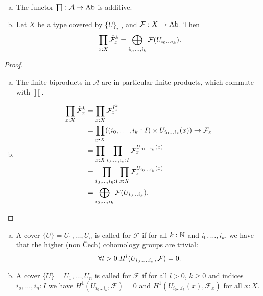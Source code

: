 \begin{remark}
  \label{cech-sheaf-pi-direct-sum}
  \begin{enumerate}[(a)]
  \item The functor $\prod:\mathcal A \to \operatorname{Ab}$ is additive.
  \item Let $X$ be a type covered by $\{U\}_{i:I}$ and $\mathcal F : X\to \operatorname{Ab}$.
    Then 
    \[
      \prod_{x:X} \check{\mathcal F}^k_x=\bigoplus_{i_0,\dots,i_k}\mathcal F(U_{i_0\dots i_k})
      \rlap{.}
    \]
  \end{enumerate}
\end{remark}

\begin{proof}
  \begin{enumerate}[(a)]
  \item The finite biproducts in $\mathcal A$ are in particular finite products, which commute with $\prod$.
  \item \begin{align*}
          \prod_{x:X} \check{\mathcal F}^k_x &= \prod_{x:X} \mathcal F_x^{I^k_x} \\
                                             &= \prod_{x:X} ((i_0, \dots, i_k:I)\times U_{i_0\dots i_k}(x))\to \mathcal F_x \\
                                             &= \prod_{x:X} \prod_{i_0, \dots, i_k:I} \mathcal F_x^{U_{i_0\dots i_k}(x)} \\
                                             &= \prod_{i_0, \dots, i_k:I} \prod_{x:X} \mathcal F_x^{U_{i_0\dots i_k}(x)} \\
                                             &= \bigoplus_{i_0,\dots,i_k}\mathcal F(U_{i_0\dots i_k})\rlap{.}
        \end{align*}
  \end{enumerate}
\end{proof}

\begin{definition}
  \begin{enumerate}[(a)]
  \item A cover $\{U\}=U_1,\dots,U_n$ is called  for $\mathcal F$
    if for all $k:\mathbb{N}$ and $i_0,\dots,i_k$, we have that the higher (non Čech) cohomology groups are trivial:
    \[
      \forall l>0. H^l(U_{i_0,\dots,i_k},\mathcal F)=0\rlap{.}
    \]
  \item A cover $\{U\}=U_1,\dots,U_n$ is called  for $\mathcal F$
    if for all $l>0$, $k\geq 0$ and indices $i_o,\dots,i_n:I$ we have $H^1(U_{i_0\dots i_k},\mathcal F)=0$ and $H^1(U_{i_0\dots i_k}(x),\mathcal F_x)$ for all $x:X$.
  \end{enumerate}
\end{definition}


